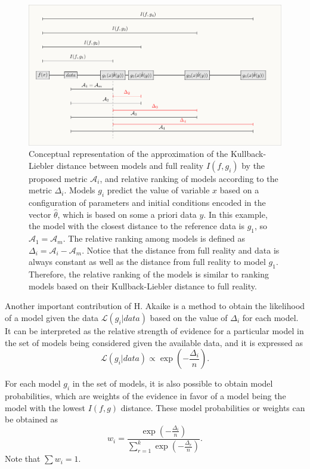 \documentclass[gmd, manuscript]{copernicus}
\begin{document}
\begin{figure}[ht]
   \centering
   \includegraphics[width=14cm]{Figures/distances.pdf} %
   \caption{Conceptual representation of the approximation of the Kullback-Liebler distance between models and full reality $I(f, g_i)$ by the proposed metric $\mathcal{A}_i$, and relative ranking of models according to the metric $\Delta_i$. Models $g_i$ predict the value of variable $x$ based on a configuration of parameters and initial conditions encoded in the vector $\hat{\theta}$, which is based on some a priori data $y$. In this example, the model with the closest distance to the reference data is $g_1$, so $\mathcal{A}_1 = \mathcal{A}_m$. The relative ranking among models is defined as $\Delta_i = \mathcal{A}_i - \mathcal{A}_m$. Notice that the distance from full reality and data is always constant as well as the distance from full reality to model $g_1$. Therefore, the relative ranking of the models is similar to ranking models based on their Kullback-Liebler distance to full reality.}
   \label{fig:concept}
\end{figure}

Another important contribution of H. Akaike is a method to obtain the likelihood of a model given the data $\mathcal{L}(g_i | data)$ based on the value of $\Delta_i$ for each model. It can be interpreted as the relative strength of evidence for a particular model in the set of models being considered given the available data, and it is expressed as
\begin{equation}
\mathcal{L}(g_i | data) \varpropto \exp \left( - \frac{ \Delta_i}{n} \right).
\end{equation}

For each model $g_i$ in the set of models, it is also possible to obtain model probabilities, which are weights of the evidence in favor of a model being the model with the lowest $I(f, g)$ distance. These model probabilities or weights can be obtained as
\begin{equation} \label{eq:wi}
w_i = \frac{\exp (-\frac{\Delta_i}{n})}{\sum_{r=1}^k \exp(- \frac{\Delta_r}{n})}.
\end{equation}
Note that $\sum w_i =1$. 
\end{document}

